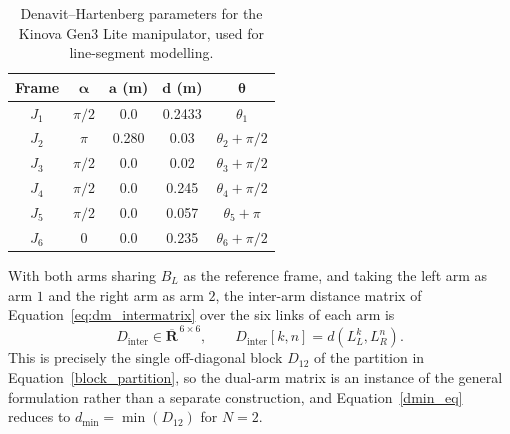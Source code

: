 \begin{table}[htbp]
\centering
\caption{Denavit--Hartenberg parameters for the Kinova Gen3 Lite manipulator, used for line-segment
modelling.}
\label{tab:dm_dh}
\begin{tabular}{ccccc}
\toprule
\textbf{Frame} & $\boldsymbol{\alpha}$ & $\mathbf{a}$ (m) & $\mathbf{d}$ (m) & $\boldsymbol{\theta}$ \\
\midrule
$J_1$ & $\pi/2$ & 0.0   & 0.2433 & $\theta_1$ \\
$J_2$ & $\pi$   & 0.280 & 0.03   & $\theta_2 + \pi/2$ \\
$J_3$ & $\pi/2$ & 0.0   & 0.02   & $\theta_3 + \pi/2$ \\
$J_4$ & $\pi/2$ & 0.0   & 0.245  & $\theta_4 + \pi/2$ \\
$J_5$ & $\pi/2$ & 0.0   & 0.057  & $\theta_5 + \pi$ \\
$J_6$ & 0       & 0.0   & 0.235  & $\theta_6 + \pi/2$ \\
\bottomrule
\end{tabular}
\end{table}

With both arms sharing $B_L$ as the reference frame, and taking the left arm as arm $1$ and the right
arm as arm $2$, the inter-arm distance matrix of Equation~\eqref{eq:dm_intermatrix} over the six links
of each arm is
\begin{equation}
D_{\text{inter}} \in \overline{\mathbf{R}}^{\,6 \times 6}, \qquad D_{\text{inter}}[k,n] = d(L_L^k, L_R^n).
\label{eq:dm_interarm}
\end{equation}
This is precisely the single off-diagonal block $D_{12}$ of the partition in
Equation~\eqref{block_partition}, so the dual-arm matrix is an instance of the general formulation
rather than a separate construction, and Equation~\eqref{dmin_eq} reduces to
$d_{\min} = \min(D_{12})$ for $N = 2$.


